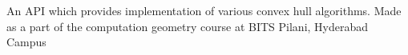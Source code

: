 An A\+PI which provides implementation of various convex hull algorithms. Made as a part of the computation geometry course at B\+I\+TS Pilani, Hyderabad Campus 